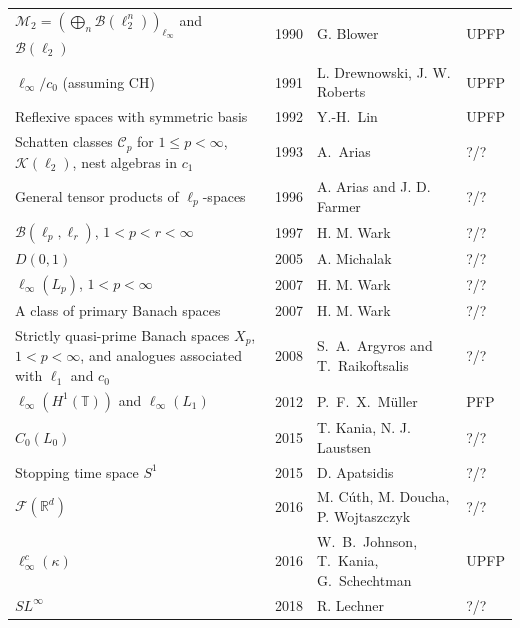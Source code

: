\documentclass[11pt]{amsart}
\theoremstyle{plain}
\theoremstyle{definition}
\numberwithin{equation}{section}
\newcommand{\Bop}{\mathcal{B}}
\newcommand{\CH}{\mathrm{CH}}
\begin{document}
\begin{longtable}{@{}L{0.30\textwidth}L{0.08\textwidth}L{0.29\textwidth}L{0.23\textwidth}@{}}
$\mathcal M_2=(\bigoplus_n\Bop(\ell_2^n))_{\ell_\infty}$ and $\Bop(\ell_2)$ & 1990 &
G. Blower \cite{Blower1990} & UPFP  \\

$\ell_\infty/c_0$ (assuming $\CH$) & 1991 &
L. Drewnowski, J. W. Roberts \cite{DrewnowskiRoberts1991} & UPFP \\

Reflexive spaces with symmetric basis & 1992 &
Y.-H.~Lin \cite{Lin1992} & UPFP \\
Schatten classes $\mathcal{C}_p$ for $1\leqslant p < \infty$, $\mathcal{K}(\ell_2)$, nest algebras in $c_1$ & 1993 &
A.~Arias \cite{Arias1993} & ?/? \\
General tensor products of $\ell_p$-spaces & 1996 &
A. Arias and J. D. Farmer \cite{AriasFarmer} & ?/? \\

$\Bop(\ell_p,\ell_r)$, $1 < p < r < \infty$ & 1997 &
H. M. Wark \cite{Wark1997} & ?/? \\

$D(0,1)$ & 2005 &
A. Michalak \cite{Michalak2005} & ?/? \\

$\ell_\infty(L_p)$, $1 < p < \infty$ & 2007 &
H. M. Wark \cite{Wark2007} & ?/? \\

A class of primary Banach spaces & 2007 &
H. M. Wark \cite{Wark2007b} & ?/? \\

Strictly quasi-prime Banach spaces $X_p$, $1<p<\infty$, and analogues
associated with $\ell_1$ and $c_0$ & 2008 &
S.~A.~Argyros and T.~Raikoftsalis \cite{ArgyrosRaikoftsalis2008} & ?/? \\

$\ell_\infty(H^1(\mathbb{T}))$ and $\ell_\infty(L_1)$ & 2012 &
P.~F.~X.~M\"uller \cite{Muller2012} & PFP \\

$C_0(L_0)$ & 2015 &
T. Kania, N. J. Laustsen \cite{KaniaLaustsen2015} & ?/? \\

Stopping time space $S^1$ & 2015 &
D. Apatsidis \cite{Apatsidis2015} & ?/? \\

$\mathcal{F}(\mathbb{R}^d)$ & 2016 &
M. C\'uth, M. Doucha, P. Wojtaszczyk \cite{CuthDouchaWojtaszczyk2016} & ?/? \\
$\ell_\infty^c(\kappa)$ & 2016 & W.~B.~Johnson, T.~Kania, G.~Schechtman \cite{JKS2016} & UPFP \\
$SL^\infty$ & 2018 &
R. Lechner \cite{Lechner2018} & ?/? \\


\end{longtable}
\end{document}
